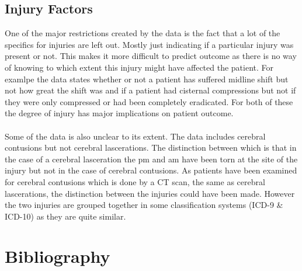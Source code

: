 \documentclass[11pt]{article}
\begin{document}
\subsection{Injury Factors}
One of the major restrictions created by the data is the fact that a lot of the specifics for injuries are left out. Mostly just indicating if a particular injury was present or not. This makes it more difficult to predict outcome as there is no way of knowing to which extent this injury might have affected the patient. For examlpe the data states whether or not a patient has suffered midline shift but not how great the shift was and if a patient had cisternal compressions but not if they were only compressed or had been completely eradicated. For both of these the degree of injury has major implications on patient outcome.\\
\\
Some of the data is also unclear to its extent. The data includes cerebral contusions but not cerebral lascerations. The distinction between which is that in the case of a cerebral lasceration the \gls{pm} and \gls{am} have been torn at the site of the injury but not in the case of cerebral contusions. As patients have been examined for cerebral contusions which is done by a CT scan\cite{CerebralContusion2020}, the same as cerebral lascerations\cite{CerebralLaceration2018}, the distinction between the injuries could have been made. However the two injuries are grouped together in some classification systems (ICD-9 \& ICD-10\cite{CerebralLaceration2018}\cite{ICD102021}) as they are quite similar.

\clearpage

\printglossary
\printglossary[type=\acronymtype]

\section{Bibliography}

\printbibliography
\end{document}
